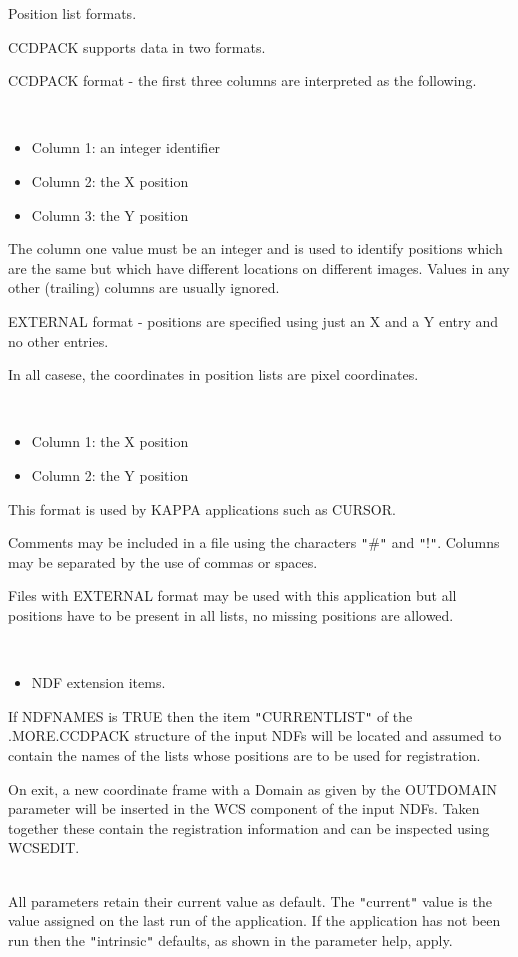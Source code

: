 \documentclass[twoside,11pt]{article}
\newcommand{\xref}[3]{#1}
\renewcommand{\_}{\texttt{\symbol{95}}}
\newcommand{\qt}[1]{{\tt "}#1{\tt "}}
\newcommand{\sstdiytopic}[2]{\item[#1:] \mbox{} \\[1.3ex] #2}
\newcommand{\sstitemlist}[1]{
  \mbox{} \\
  \vspace{-3.5ex}
  \begin{itemize}
     #1
  \end{itemize}
}
\newcommand{\sstitem}{\item}
\newcommand{\sstdiytopic}[2]{\item[{#1}] #2 }
\newcommand{\sstitemlist}[1]{
      \begin{itemize}
         #1
      \end{itemize}
      \\
   }
\newcommand{\sstitem}{\item}
\begin{document}
{{{         \sstitem
         Position list formats.

      }
        CCDPACK supports data in two formats.

        CCDPACK format - the first three columns are interpreted as the
        following.

      \sstitemlist{

         \sstitem
              Column 1: an integer identifier

         \sstitem
              Column 2: the X position

         \sstitem
              Column 3: the Y position

      }
        The column one value must be an integer and is used to identify
        positions which are the same but which have different locations
        on different images. Values in any other (trailing) columns are
        usually ignored.

        EXTERNAL format - positions are specified using just an X and
        a Y entry and no other entries.

        In all casese, the coordinates in position lists are pixel
        coordinates.

      \sstitemlist{

         \sstitem
              Column 1: the X position

         \sstitem
              Column 2: the Y position

      }
        This format is used by KAPPA applications such as
        \xref{CURSOR}{sun95}{CURSOR}.

        Comments may be included in a file using the characters \qt{\#} and
        \qt{!}. Columns may be separated by the use of commas or spaces.

        Files with EXTERNAL format may be used with this application but
        all positions have to be present in all lists, no missing
        positions are allowed.

      \sstitemlist{

         \sstitem
         NDF extension items.

      }
        If NDFNAMES is TRUE then the item \qt{CURRENT\_LIST} of the
        .MORE.CCDPACK structure of the input NDFs will be located
        and assumed to contain the names of the lists whose positions
        are to be used for registration.

        On exit, a new coordinate frame with a Domain as given by the
        OUTDOMAIN parameter will be inserted in the WCS component of 
        the input NDFs.  Taken together these contain the registration
        information and can be inspected using WCSEDIT.
   }
   \sstdiytopic{
      Behaviour of parameters
   } {
      All parameters retain their current value as default. The
      \qt{current} value is the value assigned on the last run of the
      application. If the application has not been run then the
      \qt{intrinsic} defaults, as shown in the parameter help, apply.

}}
\end{document}
